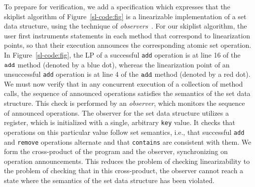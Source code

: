 To prepare for verification, we add a specification which expresses that
the skiplist algorithm of Figure~\ref{sl-code:fig} is a
linearizable implementation of a set data structure, using
the technique of
{\em observers}~\cite{AHHR:integrated,BEEH:icalp15,HSV:concur13,Quy:sas16}.
For our skiplist algorithm, the user first instruments statements in each
method that correspond to linearization points, so that their execution
announces the corresponding atomic set operation.
In Figure~\ref{sl-code:fig}, the LP of a successful {\tt add} operation is at line 16 of the $\tt add$ method (denoted by a blue dot), whereas the linearization point of an unsuccessful {\tt add} operation is at line 4 of the $\tt add$
method (denoted by a red dot).
We must now verify that in any concurrent
execution of a collection of method calls, the sequence of announced
operations satisfies the semantics of the set data structure.
This check is performed by an {\em observer}, which
monitors the sequence of announced operations. The observer for the set
data structure utilizes a register, which is initialized with
a single, arbitrary {\tt key} value.
It checks that operations on this particular value follow set semantics,
i.e., that successful {\tt add} and {\tt remove} operations alternate and that
{\tt contains} are consistent with them.
We form %
the cross-product of the program  and the observer, synchronizing on
operation announcements. This reduces the
problem of checking linearizability to the problem of checking that
in this cross-product, the observer cannot reach a state where
the semantics of the set data structure has been violated.



